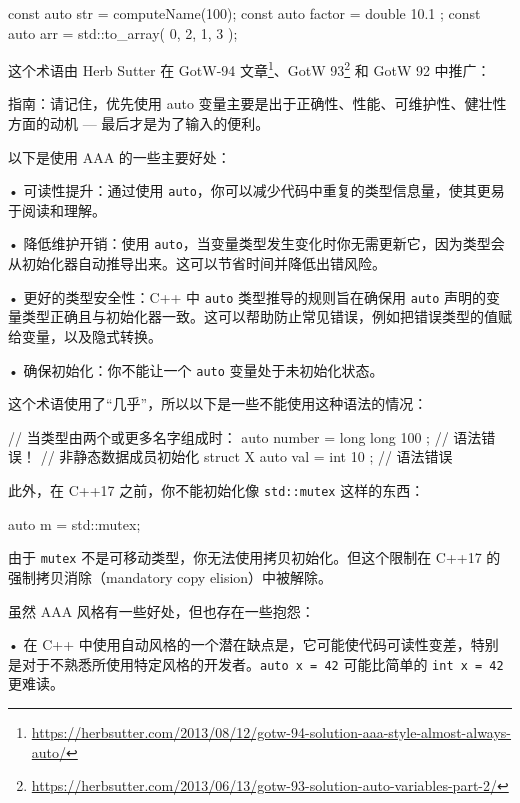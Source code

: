 \begin{codebox}[cpp]
const auto str
= computeName(100);
const auto factor = double { 10.1 };
const auto arr
= std::to_array({ 0, 2, 1, 3 });
\end{codebox}

这个术语由 Herb Sutter 在 GotW-94 文章\footnote{\url{https://herbsutter.com/2013/08/12/gotw-94-solution-aaa-style-almost-always-auto/}}、GotW 93\footnote{\url{https://herbsutter.com/2013/06/13/gotw-93-solution-auto-variables-part-2/}} 和 GotW 92 中推广：

\begin{myQuote}
指南：请记住，优先使用 auto 变量主要是出于正确性、性能、可维护性、健壮性方面的动机 — 最后才是为了输入的便利。
\end{myQuote}

以下是使用 AAA 的一些主要好处：

• 可读性提升：通过使用 \texttt{auto}，你可以减少代码中重复的类型信息量，使其更易于阅读和理解。

• 降低维护开销：使用 \texttt{auto}，当变量类型发生变化时你无需更新它，因为类型会从初始化器自动推导出来。这可以节省时间并降低出错风险。

• 更好的类型安全性：C++ 中 \texttt{auto} 类型推导的规则旨在确保用 \texttt{auto} 声明的变量类型正确且与初始化器一致。这可以帮助防止常见错误，例如把错误类型的值赋给变量，以及隐式转换。

• 确保初始化：你不能让一个 \texttt{auto} 变量处于未初始化状态。

这个术语使用了“几乎”，所以以下是一些不能使用这种语法的情况：

\begin{codebox}[cpp]
// 当类型由两个或更多名字组成时：
auto number = long long { 100 }; // 语法错误！
// 非静态数据成员初始化
struct X {
auto val = int { 10 }; // 语法错误
}
\end{codebox}

此外，在 C++17 之前，你不能初始化像 \texttt{std::mutex} 这样的东西：

\begin{codebox}[cpp]
auto m = std::mutex{};
\end{codebox}

由于 \texttt{mutex} 不是可移动类型，你无法使用拷贝初始化。但这个限制在 C++17 的强制拷贝消除（mandatory copy elision）中被解除。

虽然 AAA 风格有一些好处，但也存在一些抱怨：

• 在 C++ 中使用自动风格的一个潜在缺点是，它可能使代码可读性变差，特别是对于不熟悉所使用特定风格的开发者。\texttt{auto x = 42} 可能比简单的 \texttt{int x = 42} 更难读。

